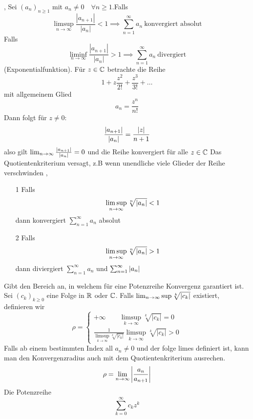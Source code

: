 \sep
\Satz[2.53(Quotientenkriterium] \newline Sei \((a_n)_{n \geq 1}\) mit \(a_n \neq 0 \quad \forall n \geq 1 \).Falls
\[\limsup\limits_{n \rightarrow \infty} \frac{\left|a_{n+1}\right|}{\left|a_{n}\right|}<1 \implies \sum_{n=1}^{\infty} a_{n} \ \text{konvergiert absolut}\]
Falls
\[\liminf\limits_{n \rightarrow \infty} \frac{\left|a_{n+1}\right|}{\left|a_{n}\right|}>1 \implies \sum_{n=1}^{\infty} a_{n} \ \text{divergiert}\]
\Bsp[2.54](Exponentialfunktion). Für \( z \in \mathbb{C} \) betrachte die Reihe
\[ 1 + z \frac{z^2}{2!} + \frac{z^3}{3!} + \dots\]
mit allgemeinem Glied
\[ a_n = \frac{z^n}{n!}\]
Dann folgt für \( z \neq 0:\)
\[ \frac{\left\lvert a_{n+1} \right\rvert}{\left\lvert a_n \right\rvert} = \frac{\left\lvert z \right\rvert}{n+1}\]
also gilt \( \lim_{n \rightarrow \infty} \frac{\left\lvert a_{n+1} \right\rvert}{\left\lvert a_n \right\rvert} = 0\)
und die Reihe konvergiert für alle \( z \in \mathbb{C}\) \newline
{} Das Quotientenkriterium versagt, z.B wenn unendliche viele Glieder der Reihe verschwinden
\sep
\Satz[2.56 Wurzelkriterium]
\begin{enumerate}
    \item [1] Falls \[\limsup\limits_{n \rightarrow \infty} \sqrt[n]{\left\lvert a_n \right\rvert} < 1\] dann konvergiert \(\sum_{n=1}^{\infty} a_n\) absolut
    \item [2] Falls \[\limsup\limits_{n \rightarrow \infty} \sqrt[n]{\left\lvert a_n \right\rvert} > 1\] dann diviergiert \(\sum_{n=1}^{\infty} a_n\) und \(\sum_{n=1}^{\infty}\left\lvert a_n \right\rvert \)
\end{enumerate}
\Def[Kovergenzradius]
Gibt den Bereich an, in welchem für eine Potenzreihe Konvergenz garantiert ist.
Sei \((c_k)_{k \geq 0} \) eine Folge in \( \mathbb{R} \) oder \( \mathbb{C} \). Falls \( \lim_{n \rightarrow \infty} \sup \sqrt[k]{\left\lvert c_k \right\rvert}\) existiert, definieren wir
\begin{equation}
    \rho=\left\{\begin{array}{cc}
    +\infty \quad \quad \limsup _{k \rightarrow \infty} \sqrt[k]{\left|c_{k}\right|}=0 \\
    \frac{1}{\limsup _{k \rightarrow \infty} \sqrt[k]{\left|c_{k}\right|}} \limsup _{k \rightarrow \infty} \sqrt[k]{\left|c_{k}\right|}>0
    \end{array}\right.
    \end{equation}
Falls ab einem bestimmten Index all \(a_n \neq 0\) und der folge limes definiert ist, kann man den Konvergenzradius auch mit dem Quotientenkriterium ausrechen.
\[ \rho = \lim_{n \rightarrow \infty} \left\lvert \frac{a_n}{a_{n+1}} \right\rvert\]
\Korollar[2.57] Die Potenzreihe \[\sum_{k=0}^{\infty} c_kz^k\]
